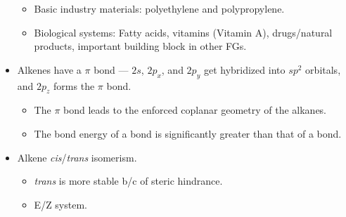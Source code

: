 \documentclass[../notes.tex]{subfiles}
\begin{document}
\begin{itemize}
\begin{itemize}
        \item Basic industry materials: polyethylene and polypropylene.
        \item Biological systems: Fatty acids, vitamins (Vitamin A), drugs/natural products, important building block in other FGs.
    \end{itemize}
    \item Alkenes have a $\pi$ bond --- $2s$, $2p_x$, and $2p_y$ get hybridized into $sp^2$ orbitals, and $2p_z$ forms the $\pi$ bond.
    \begin{itemize}
        \item The $\pi$ bond leads to the enforced coplanar geometry of the alkanes.
        \item The bond energy of a  bond is significantly greater than that of a  bond.
    \end{itemize}
    \item Alkene \emph{cis}/\emph{trans} isomerism.
    \begin{itemize}
        \item \emph{trans} is more stable b/c of steric hindrance.
        \item E/Z system.
    \end{itemize}
\end{itemize}
\end{document}
